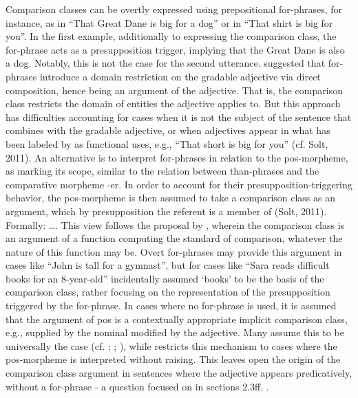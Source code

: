 Comparison classes can be overtly expressed using prepositional for-phrases, for instance, as in “That Great Dane is big for a dog” or in “That shirt is big for you”. In the first example, additionally to expressing the comparison class, the for-phrase acts as a presupposition trigger, implying that the Great Dane is also a dog. Notably, this is not the case for the second utterance. 
\cite{Kennedy2007} suggested that for-phrases introduce a domain restriction on the gradable adjective via direct composition, hence being an argument of the adjective. That is, the comparison class restricts the domain of entities the adjective applies to. But this approach has difficulties accounting for cases when it is not the subject of the sentence that combines with the gradable adjective, or when adjectives appear in what has been labeled by \cite{ebeling1994children} as functional uses, e.g., “That short is big for you” (cf. Solt, 2011). An alternative is to interpret for-phrases in relation to the pos-morpheme, as marking its scope, similar to the relation between than-phrases and the comparative morpheme -er. In order to account for their presupposition-triggering behavior, the pos-morpheme is then assumed to take a comparison class as an argument, which by presupposition the referent is a member of (Solt, 2011). 
Formally: ….
This view follows the proposal by \cite{bartsch1973}, wherein the comparison class is an argument of a function computing the standard of comparison, whatever the nature of this function may be.   
Overt for-phrases may provide this argument in cases like “John is tall for a gymnast”, but for cases like “Sara reads difficult books for an 8-year-old” \cite{Solt2009} incidentally assumed ‘books’ to be the basis of the comparison class, rather focusing on the representation of the presupposition triggered by the for-phrase. In cases where no for-phrase is used, it is assumed that the argument of pos is a contextually appropriate implicit comparison class, e.g., supplied by the nominal modified by the adjective. Many assume this to be universally the case (cf. \cite{Cresswell1976}; \cite{Kamp1975}; \cite{Heim2000}), while \cite{Solt2009} restricts this mechanism to cases where the pos-morpheme is interpreted without raising. This leaves open the origin of the comparison class argument in sentences where the adjective appears predicatively, without a for-phrase - a question focused on in sections 2.3ff. . 
